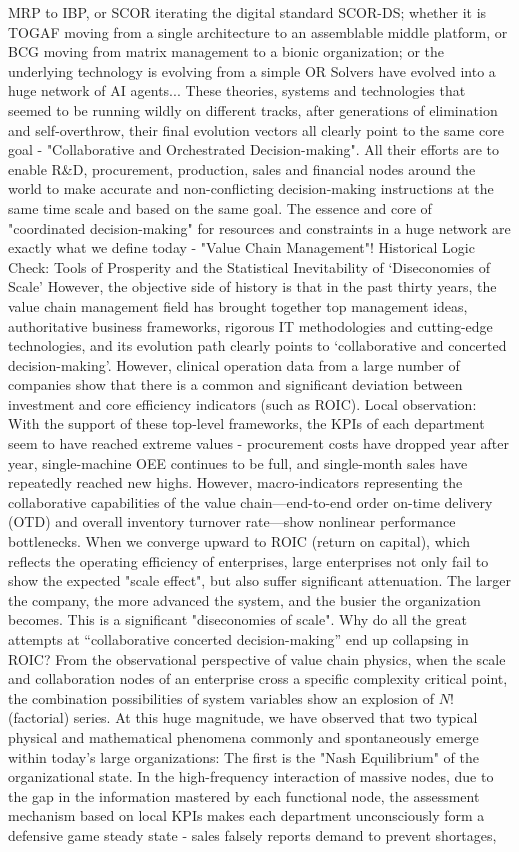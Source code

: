\documentclass[11pt,a4paper]{article}
\begin{document}
MRP to IBP, or SCOR iterating the digital standard SCOR-DS; whether it is TOGAF moving from a single architecture to an assemblable middle platform, or BCG moving from matrix management to a bionic organization; or the underlying technology is evolving from a simple OR Solvers have evolved into a huge network of AI agents... These theories, systems and technologies that seemed to be running wildly on different tracks, after generations of elimination and self-overthrow, their final evolution vectors all clearly point to the same core goal - "Collaborative and Orchestrated Decision-making". All their efforts are to enable R\&D, procurement, production, sales and financial nodes around the world to make accurate and non-conflicting decision-making instructions at the same time scale and based on the same goal. The essence and core of "coordinated decision-making" for resources and constraints in a huge network are exactly what we define today - "Value Chain Management"! Historical Logic Check: Tools of Prosperity and the Statistical Inevitability of ‘Diseconomies of Scale’ However, the objective side of history is that in the past thirty years, the value chain management field has brought together top management ideas, authoritative business frameworks, rigorous IT methodologies and cutting-edge technologies, and its evolution path clearly points to ‘collaborative and concerted decision-making’. However, clinical operation data from a large number of companies show that there is a common and significant deviation between investment and core efficiency indicators (such as ROIC). Local observation: With the support of these top-level frameworks, the KPIs of each department seem to have reached extreme values - procurement costs have dropped year after year, single-machine OEE continues to be full, and single-month sales have repeatedly reached new highs. However, macro-indicators representing the collaborative capabilities of the value chain—end-to-end order on-time delivery (OTD) and overall inventory turnover rate—show nonlinear performance bottlenecks. When we converge upward to ROIC (return on capital), which reflects the operating efficiency of enterprises, large enterprises not only fail to show the expected "scale effect", but also suffer significant attenuation. The larger the company, the more advanced the system, and the busier the organization becomes. This is a significant "diseconomies of scale". Why do all the great attempts at “collaborative concerted decision-making” end up collapsing in ROIC? From the observational perspective of value chain physics, when the scale and collaboration nodes of an enterprise cross a specific complexity critical point, the combination possibilities of system variables show an explosion of $N!$ (factorial) series. At this huge magnitude, we have observed that two typical physical and mathematical phenomena commonly and spontaneously emerge within today's large organizations: The first is the "Nash Equilibrium" of the organizational state. In the high-frequency interaction of massive nodes, due to the gap in the information mastered by each functional node, the assessment mechanism based on local KPIs makes each department unconsciously form a defensive game steady state - sales falsely reports demand to prevent shortages, 
\end{document}
